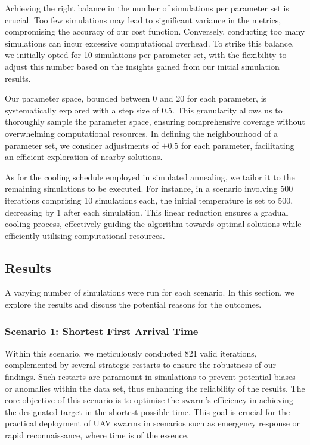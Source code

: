 \documentclass[12pt]{article}
\begin{document}
Achieving the right balance in the number of simulations per parameter set is crucial. Too few simulations may lead to significant variance in the metrics, compromising the accuracy of our cost function. Conversely, conducting too many simulations can incur excessive computational overhead. To strike this balance, we initially opted for 10 simulations per parameter set, with the flexibility to adjust this number based on the insights gained from our initial simulation results.

Our parameter space, bounded between 0 and 20 for each parameter, is systematically explored with a step size of 0.5. This granularity allows us to thoroughly sample the parameter space, ensuring comprehensive coverage without overwhelming computational resources. In defining the neighbourhood of a parameter set, we consider adjustments of $\pm 0.5$ for each parameter, facilitating an efficient exploration of nearby solutions.

As for the cooling schedule employed in simulated annealing, we tailor it to the remaining simulations to be executed. For instance, in a scenario involving 500 iterations comprising 10 simulations each, the initial temperature is set to 500, decreasing by 1 after each simulation. This linear reduction ensures a gradual cooling process, effectively guiding the algorithm towards optimal solutions while efficiently utilising computational resources.

\subsection{Results}
A varying number of simulations were run for each scenario. In this section, we explore the results and discuss the potential reasons for the outcomes.

\subsubsection{Scenario 1: Shortest First Arrival Time}
Within this scenario, we meticulously conducted 821 valid iterations, complemented by several strategic restarts to ensure the robustness of our findings. Such restarts are paramount in simulations to prevent potential biases or anomalies within the data set, thus enhancing the reliability of the results. The core objective of this scenario is to optimise the swarm's efficiency in achieving the designated target in the shortest possible time. This goal is crucial for the practical deployment of UAV swarms in scenarios such as emergency response or rapid reconnaissance, where time is of the essence.
\end{document}
